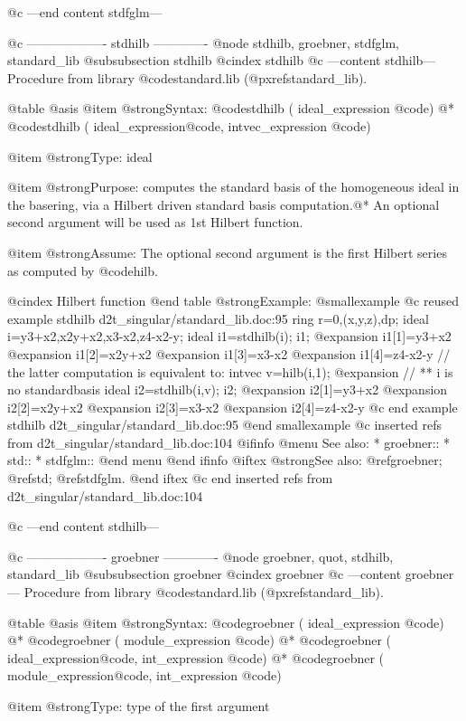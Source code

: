 @c ---end content stdfglm---

@c ------------------- stdhilb -------------
@node stdhilb, groebner, stdfglm, standard_lib
@subsubsection stdhilb
@cindex stdhilb
@c ---content stdhilb---
Procedure from library @code{standard.lib} (@pxref{standard_lib}).

@table @asis
@item @strong{Syntax:}
@code{stdhilb (} ideal_expression @code{)} @*
@code{stdhilb (} ideal_expression@code{,} intvec_expression @code{)}

@item @strong{Type:}
ideal

@item @strong{Purpose:}
computes the standard basis of the homogeneous ideal in the basering,
via a Hilbert driven standard basis computation.@*
An optional second argument will be used as 1st Hilbert function.

@item @strong{Assume:}
The optional second argument is the first Hilbert series as computed
by @code{hilb}.

@cindex Hilbert function
@end table
@strong{Example:}
@smallexample
@c reused example stdhilb d2t_singular/standard_lib.doc:95 
   ring  r=0,(x,y,z),dp;
ideal i=y3+x2,x2y+x2,x3-x2,z4-x2-y;
ideal i1=stdhilb(i); i1;
@expansion{} i1[1]=y3+x2
@expansion{} i1[2]=x2y+x2
@expansion{} i1[3]=x3-x2
@expansion{} i1[4]=z4-x2-y
// the latter computation is equivalent to:
intvec v=hilb(i,1);
@expansion{} // ** i is no standardbasis
ideal i2=stdhilb(i,v); i2;
@expansion{} i2[1]=y3+x2
@expansion{} i2[2]=x2y+x2
@expansion{} i2[3]=x3-x2
@expansion{} i2[4]=z4-x2-y
@c end example stdhilb d2t_singular/standard_lib.doc:95
@end smallexample
@c inserted refs from d2t_singular/standard_lib.doc:104
@ifinfo
@menu
See also:
* groebner::
* std::
* stdfglm::
@end menu
@end ifinfo
@iftex
@strong{See also:}
@ref{groebner};
@ref{std};
@ref{stdfglm}.
@end iftex
@c end inserted refs from d2t_singular/standard_lib.doc:104

@c ---end content stdhilb---

@c ------------------- groebner -------------
@node groebner, quot, stdhilb, standard_lib
@subsubsection groebner
@cindex groebner
@c ---content groebner---
Procedure from library @code{standard.lib} (@pxref{standard_lib}).

@table @asis
@item @strong{Syntax:}
@code{groebner (} ideal_expression @code{)} @*
@code{groebner (} module_expression @code{)} @*
@code{groebner (} ideal_expression@code{,} int_expression @code{)} @*
@code{groebner (} module_expression@code{,} int_expression @code{)}

@item @strong{Type:}
type of the first argument

